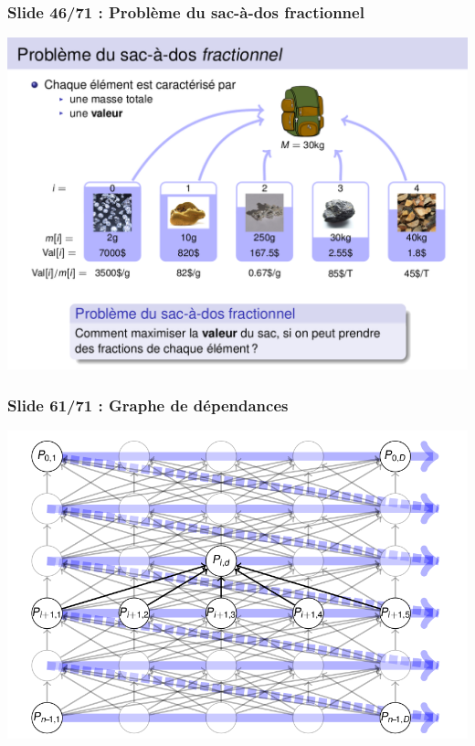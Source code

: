 \documentclass[12pt, a4paper]{article}
\begin{document}
\subsubsection{Slide 46/71 : Problème du sac-à-dos fractionnel}
\begin{center}
\includegraphics[scale=0.3]{images/INFO-H304_C12_1}
\end{center}
\subsubsection{Slide 61/71 : Graphe de dépendances}
\begin{center}
\includegraphics[scale=0.3]{images/INFO-H304_C12_2}
\end{center}
\end{document}
